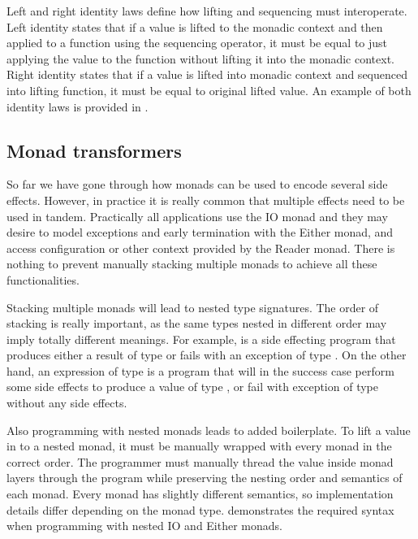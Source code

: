 

Left and right identity laws define how lifting and sequencing must interoperate.
Left identity states that if a value is lifted to the monadic context and then applied to a function using the sequencing operator, it must be equal to just applying the value to the function without lifting it into the monadic context. Right identity states that if a value is lifted into monadic context and sequenced into lifting function, it must be equal to original lifted value. An example of both identity laws is provided in .


\subsection{Monad transformers}\label{background:monad:monad-transformers}
So far we have gone through how monads can be used to encode several side effects. However, in practice it is really common that multiple effects need to be used in tandem. Practically all applications use the IO monad and they may desire to model exceptions and early termination with the Either monad, and access configuration or other context provided by the Reader monad. There is nothing to prevent manually stacking multiple monads to achieve all these functionalities.

Stacking multiple monads will lead to nested type signatures. The order of stacking is really important, as the same types nested in different order may imply totally different meanings. For example,  is a side effecting program that produces either a result of type  or fails with an exception of type . On the other hand, an expression of type  is a program that will in the success case perform some side effects to produce a value of type , or fail with exception of type  without any side effects.

Also programming with nested monads leads to added boilerplate. To lift a value in to a nested monad, it must be manually wrapped with every monad in the correct order. The programmer must manually thread the value inside monad layers through the program while preserving the nesting order and semantics of each monad. Every monad has slightly different semantics, so implementation details differ depending on the monad type.  demonstrates the required syntax when programming with nested IO and Either monads.


